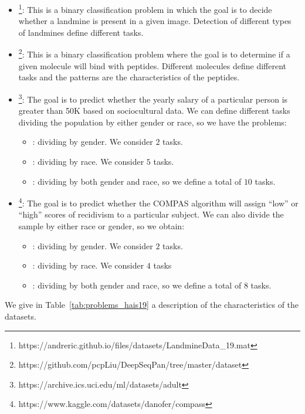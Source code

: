 \begin{itemize}
    \item {}\footnote{https://andreric.github.io/files/datasets/LandmineData\_19.mat}: This is a binary classification problem in which the goal is to decide whether a landmine is present in a given image. Detection of different types of landmines define different tasks. 
    \item {}\footnote{https://github.com/pcpLiu/DeepSeqPan/tree/master/dataset}: This is a binary classification problem where the goal is to determine if a given molecule will bind with peptides. Different molecules define different tasks and the patterns are the characteristics of the peptides.
    \item {}\footnote{https://archive.ics.uci.edu/ml/datasets/adult}: The goal is to predict whether the yearly salary of a particular person is greater than \num{50}K based on sociocultural data. We can define different tasks dividing the population by either gender or race, so we have the problems:
    \begin{itemize}
        \item {}: dividing by gender. We consider $2$ tasks.
        \item {}: dividing by race. We consider $5$ tasks.
        \item {}: dividing by both gender and race, so we define a total of $10$ tasks.
    \end{itemize}
    \item {}\footnote{https://www.kaggle.com/datasets/danofer/compass}: The goal is to predict whether the COMPAS algorithm will assign ``low'' or ``high'' scores of recidivism to a particular subject. We can also divide the sample by either race or gender, so we obtain:
    \begin{itemize}
        \item {}: dividing by gender. We consider $2$ tasks.
        \item {}: dividing by race. We consider $4$ tasks
        \item {}: dividing by both gender and race, so we define a total of $8$ tasks.
    \end{itemize}
\end{itemize}
We give in Table~\ref{tab:problems_hais19} a description of the characteristics of the datasets.

